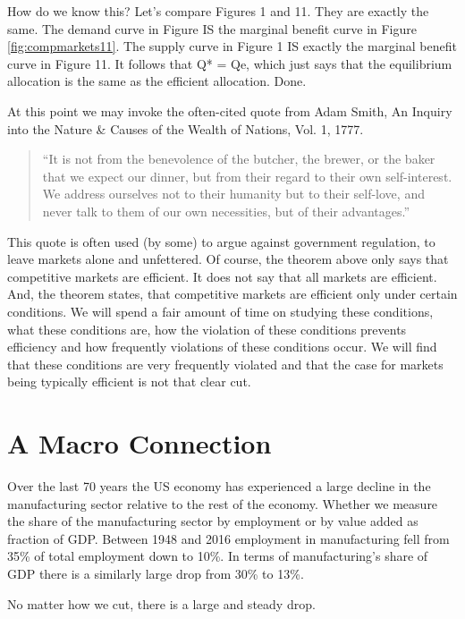 \documentclass[
]{book}
\begin{document}
How do we know this? Let's compare Figures 1 and 11. They are exactly the same. The demand curve in Figure IS the marginal benefit curve in Figure \ref{fig:compmarkets11}. The supply curve in Figure 1 IS exactly the marginal benefit curve in Figure 11. It follows that Q* = Qe, which just says that the equilibrium allocation is the same as the efficient allocation. Done.

At this point we may invoke the often-cited quote from Adam Smith, An Inquiry into the Nature \& Causes of the Wealth of Nations, Vol. 1, 1777.

\begin{quote}
``It is not from the benevolence of the butcher, the brewer, or the baker that we expect our dinner, but from their regard to their own self-interest. We address ourselves not to their humanity but to their self-love, and never talk to them of our own necessities, but of their advantages.''
\end{quote}

This quote is often used (by some) to argue against government regulation, to leave markets alone and unfettered. Of course, the theorem above only says that competitive markets are efficient. It does not say that all markets are efficient. And, the theorem states, that competitive markets are efficient only under certain conditions. We will spend a fair amount of time on studying these conditions, what these conditions are, how the violation of these conditions prevents efficiency and how frequently violations of these conditions occur. We will find that these conditions are very frequently violated and that the case for markets being typically efficient is not that clear cut.

\hypertarget{a-macro-connection}{%
\section{A Macro Connection}\label{a-macro-connection}}

Over the last 70 years the US economy has experienced a large decline in the manufacturing sector relative to the rest of the economy. Whether we measure the share of the manufacturing sector by employment or by value added as fraction of GDP. Between 1948 and 2016 employment in manufacturing fell from 35\% of total employment down to 10\%. In terms of manufacturing's share of GDP there is a similarly large drop from 30\% to 13\%.

No matter how we cut, there is a large and steady drop.
\end{document}
